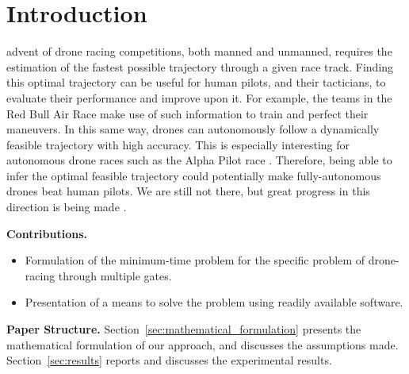
\section{Introduction}
\label{sec:introduction}

  advent of drone racing competitions, both manned and unmanned, requires the estimation of the fastest possible trajectory through a given race track.
 Finding this optimal trajectory can be useful for human pilots, and their tacticians, to evaluate their performance and improve upon it.
 For example, the teams in the Red Bull Air Race \cite{redbull} make use of such information to train and perfect their maneuvers.
 In this same way, drones can autonomously follow a dynamically feasible trajectory with high accuracy.
 This is especially interesting for autonomous drone races such as the Alpha Pilot race \cite{AlphaPilot}.
 Therefore, being able to infer the optimal feasible trajectory could potentially make fully-autonomous drones beat human pilots.
 We are still not there, but great progress in this direction is being made \cite{delmerico2019we}.

{\bf Contributions.}
\begin{itemize}
  \item Formulation of the minimum-time problem for the specific problem of drone-racing through multiple gates.
  \item Presentation of a means to solve the problem using readily available software.
\end{itemize}

{\bf Paper Structure.}
Section~\ref{sec:mathematical_formulation} presents the mathematical formulation of our approach, and discusses the assumptions made.
Section~\ref{sec:results} reports and discusses the experimental results.
